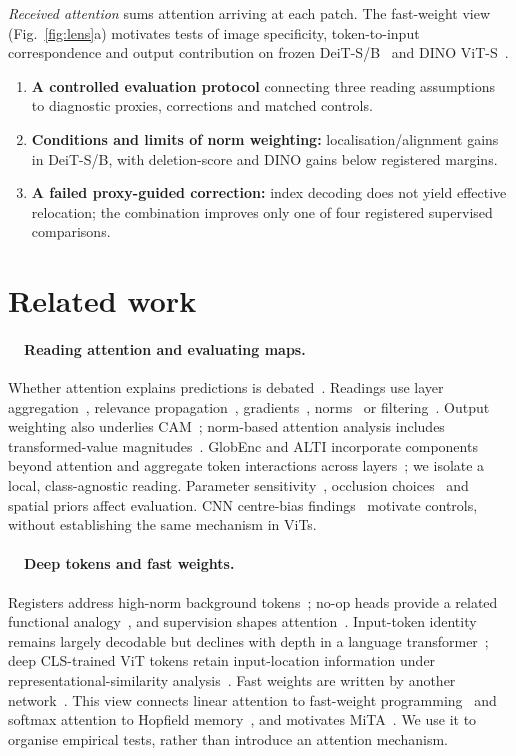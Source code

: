 \documentclass{article}
\newcommand{\rsub}[1]{\refstepcounter{subsection}\paragraph{\thesubsection~~#1}}
\begin{document}
\emph{Received attention} sums attention arriving at each patch. The fast-weight view (Fig.~\ref{fig:lens}a) motivates tests of image specificity, token-to-input correspondence and output contribution on frozen DeiT-S/B~\citep{touvron2021} and DINO ViT-S~\citep{caron2021}.

\begin{samepage}
\begin{enumerate}[nosep,leftmargin=1.7em,label=(\arabic*)]
\item \textbf{A controlled evaluation protocol} connecting three reading assumptions to diagnostic proxies, corrections and matched controls.
\item \textbf{Conditions and limits of norm weighting:} localisation/alignment gains in DeiT-S/B, with deletion-score and DINO gains below registered margins.
\item \textbf{A failed proxy-guided correction:} index decoding does not yield effective relocation; the combination improves only one of four registered supervised comparisons.
\end{enumerate}
\par
\end{samepage}

\section{Related work}
\label{sec:related}
\rsub{Reading attention and evaluating maps.} Whether attention explains predictions is debated~\citep{jain2019,wiegreffe2019}. Readings use layer aggregation~\citep{abnar2020}, relevance propagation~\citep{chefer2021}, gradients~\citep{chefer2021generic}, norms~\citep{kobayashi2020,zhu2024} or filtering~\citep{ayyar2025}. Output weighting also underlies CAM~\citep{zhou2016}; norm-based attention analysis includes transformed-value magnitudes~\citep{kobayashi2020}. GlobEnc and ALTI incorporate components beyond attention and aggregate token interactions across layers~\citep{modarressi2022,ferrando2022}; we isolate a local, class-agnostic reading. Parameter sensitivity~\citep{adebayo2018}, occlusion choices~\citep{bluecher2024} and spatial priors affect evaluation. CNN centre-bias findings~\citep{kuang2026} motivate controls, without establishing the same mechanism in ViTs.

\rsub{Deep tokens and fast weights.} Registers address high-norm background tokens~\citep{darcet2024,jiang2025}; no-op heads provide a related functional analogy~\citep{bondarenko2023}, and supervision shapes attention~\citep{walmer2023}. Input-token identity remains largely decodable but declines with depth in a language transformer~\citep{brunner2020}; deep CLS-trained ViT tokens retain input-location information under representational-similarity analysis~\citep{raghu2021}. Fast weights are written by another network~\citep{schmidhuber1992}. This view connects linear attention to fast-weight programming~\citep{schlag2021} and softmax attention to Hopfield memory~\citep{ramsauer2021}, and motivates MiTA~\citep{wen2026mita}. We use it to organise empirical tests, rather than introduce an attention mechanism.
\end{document}
